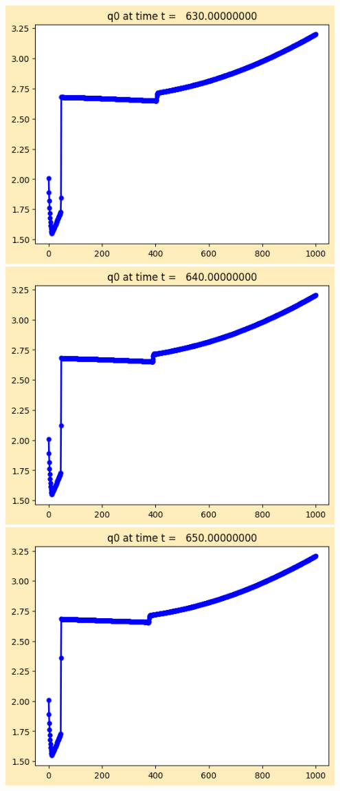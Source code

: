 \documentclass[11pt]{article}
\begin{document}
\vskip 10pt 
\includegraphics[width=0.95\textwidth]{frame0063fig1.png}
\vskip 10pt 
\includegraphics[width=0.95\textwidth]{frame0064fig1.png}
\vskip 10pt 
\includegraphics[width=0.95\textwidth]{frame0065fig1.png}
\end{document}
